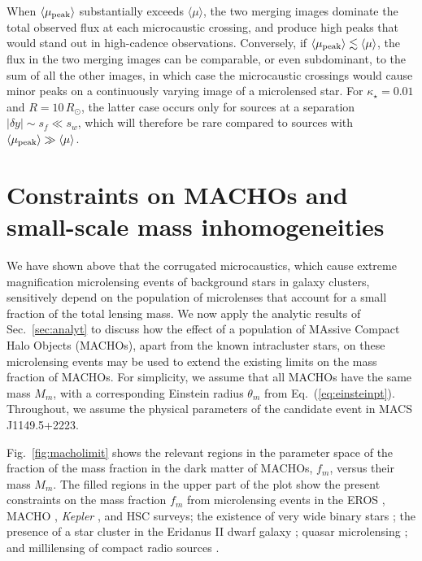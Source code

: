 \documentclass{aastex6}
\newcommand{\refeq}[1]{Eq.~(\ref{eq:#1})}
\newcommand{\reffig}[1]{Fig.~\ref{fig:#1}}
\newcommand{\refsec}[1]{Sec.~\ref{sec:#1}}
\begin{document}
When $\langle \mu_{\rm peak} \rangle$ substantially exceeds $\langle \mu \rangle$, the two merging images dominate the total observed flux at each microcaustic crossing, and produce high peaks that would stand out in high-cadence observations. Conversely, if $\langle \mu_{\rm peak} \rangle \lesssim \langle \mu \rangle $, the flux in the two merging images can be comparable, or even subdominant, to the sum of all the other images, in which case the microcaustic crossings would cause minor peaks on a continuously varying image of a microlensed star. For $\kappa_\star = 0.01$ and $R=10\,R_{\odot}$, the latter case occurs only for sources at a separation $|\delta y| \sim s_f \ll s_w$, which will therefore be rare compared to sources with $\langle \mu_{\rm peak}\rangle \gg \langle \mu \rangle$.

\section{Constraints on MACHOs and small-scale mass inhomogeneities}
\label{sec:machos}

 We have shown above that the corrugated microcaustics, which cause extreme magnification microlensing events of background stars in galaxy clusters, sensitively depend on the population of microlenses that account for a small fraction of the total lensing mass. We now apply the analytic results of \refsec{analyt} to discuss how the effect of a population of MAssive Compact Halo Objects (MACHOs), apart from the known intracluster stars, on these microlensing events may be used to extend the existing limits on the mass fraction of MACHOs. For simplicity, we assume that all MACHOs have the same mass $M_m$, with a corresponding Einstein radius $\theta_m$ from \refeq{einsteinpt}. Throughout, we assume the physical parameters of the candidate event in MACS\,J1149.5+2223.
 
 \reffig{macholimit} shows the relevant regions in the parameter space of the fraction of the mass fraction in the dark matter of MACHOs, $f_m$, versus their mass $M_m$. The filled regions in the upper part of the plot show the present constraints on the mass fraction $f_m$ from microlensing events in the EROS \citep{2007A&A...469..387T}, MACHO \citep{2001ApJ...550L.169A}, {\em Kepler} \citep{PhysRevLett.111.181302}, and HSC \citep{2017arXiv170102151N} surveys; the existence of very wide binary stars \citep{2009MNRAS.396L..11Q}; the presence of a star cluster in the Eridanus II dwarf galaxy \citep{2016ApJ...824L..31B}; quasar microlensing \citep{Mediavilla:2017bok}; and millilensing of compact radio sources \citep{Wilkinson:2001vv}.
\end{document}

